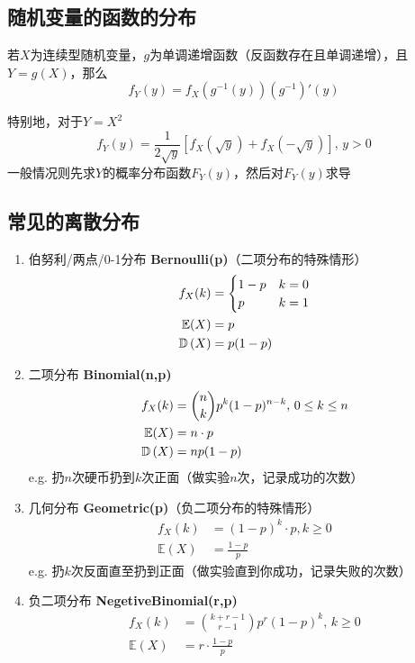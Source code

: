 \subsection{随机变量的函数的分布}
\begin{theorem}
若$X$为连续型随机变量，$g$为单调递增函数（反函数存在且单调递增），且$Y=g(X)$，那么
\[f_Y(y)=f_X(g^{-1}(y))(g^{-1})'(y)\]
\end{theorem}
特别地，对于$Y=X^2$
\[f_Y(y)=\frac{1}{2\sqrt{y}}[f_X(\sqrt{y})+f_X(-\sqrt{y})],\,y>0\]
一般情况则先求$Y$的概率分布函数$F_Y(y)$，然后对$F_Y(y)$求导

\subsection{常见的离散分布}
\begin{enumerate}
	\item 伯努利/两点/0-1分布 \textbf{Bernoulli(p)}（二项分布的特殊情形）
		\[\begin{aligned}
		f_{X}(k)&=\begin{cases}
		1-p & k=0\\
		p & k=1\\
		\end{cases}\\
		\mathbb{E}(X)&=p\\
		\mathbb{D}\left(X\right)&=p(1-p)
		\end{aligned}\]
	\item 二项分布 \textbf{Binomial(n,p)}
		\[\begin{aligned}
		f_{X}(k)& =\binom{n}{k}p^k(1-p)^{n-k},\,0\leq k\leq n\\
		\mathbb{E}(X)& =n\cdot p\\
		\mathbb{D}\left(X\right)&=np(1-p)
		\end{aligned}\]
		e.g. 扔$n$次硬币扔到$k$次正面（做实验$n$次，记录成功的次数）
	\item 几何分布 \textbf{Geometric(p)}（负二项分布的特殊情形）
		\[\begin{aligned}
		f_{X}(k)& =(1-p)^k\cdot p,k\geq 0\\
		\mathbb{E}(X)& =\frac{1-p}{p}
		\end{aligned}\]
		e.g. 扔$k$次反面直至扔到正面（做实验直到你成功，记录失败的次数）
	\item 负二项分布 \textbf{NegetiveBinomial(r,p)}
		\[\begin{aligned}
		f_{X}(k)& =\binom{k+r-1}{r-1}p^r(1-p)^k,\,k\geq 0\\
		\mathbb{E}(X)& =r\cdot\frac{1-p}{p}
		\end{aligned}\]

\end{enumerate}
